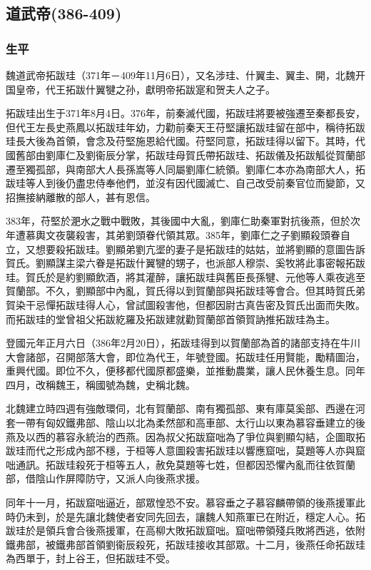 
\subsection{道武帝\tiny(386-409)}

\subsubsection{生平}

魏道武帝拓跋珪（371年－409年11月6日），又名涉珪、什翼圭、翼圭、開，北魏开国皇帝，代王拓跋什翼犍之孙，獻明帝拓跋寔和贺夫人之子。

拓跋珪出生于371年8月4日。376年，前秦滅代國，拓跋珪將要被強遷至秦都長安，但代王左長史燕鳳以拓跋珪年幼，力勸前秦天王苻堅讓拓跋珪留在部中，稱待拓跋珪長大後為首領，會念及苻堅施恩給代國。苻堅同意，拓跋珪得以留下。其時，代國舊部由劉庫仁及劉衞辰分掌，拓跋珪母賀氏帶拓跋珪、拓跋儀及拓跋觚從賀蘭部遷至獨孤部，與南部大人長孫嵩等人同屬劉庫仁統領。劉庫仁本亦為南部大人，拓跋珪等人到後仍盡忠侍奉他們，並沒有因代國滅亡、自己改受前秦官位而變節，又招撫接納離散的部人，甚有恩信。

383年，苻堅於淝水之戰中戰敗，其後國中大亂，劉庫仁助秦軍對抗後燕，但於次年遭慕輿文夜襲殺害，其弟劉頭眷代領其眾。385年，劉庫仁之子劉顯殺頭眷自立，又想要殺拓跋珪。劉顯弟劉亢埿的妻子是拓跋珪的姑姑，並將劉顯的意圖告訴賀氏。劉顯謀主梁六眷是拓跋什翼犍的甥子，也派部人穆崇、奚牧將此事密報拓跋珪。賀氏於是約劉顯飲酒，將其灌醉，讓拓跋珪與舊臣長孫犍、元他等人乘夜逃至賀蘭部。不久，劉顯部中內亂，賀氏得以到賀蘭部與拓跋珪等會合。但其時賀氏弟賀染干忌憚拓跋珪得人心，曾試圖殺害他，但都因尉古真告密及賀氏出面而失敗。而拓跋珪的堂曾祖父拓跋紇羅及拓跋建就勸賀蘭部首領賀訥推拓跋珪為主。

登國元年正月六日（386年2月20日），拓跋珪得到以賀蘭部為首的諸部支持在牛川大會諸部，召開部落大會，即位為代王，年號登國。拓跋珪任用賢能，勵精圖治，重興代國。即位不久，便移都代國原都盛樂，並推動農業，讓人民休養生息。同年四月，改稱魏王，稱國號為魏，史稱北魏。

北魏建立時四週有強敵環伺，北有賀蘭部、南有獨孤部、東有庫莫奚部、西邊在河套一帶有匈奴鐵弗部、陰山以北為柔然部和高車部、太行山以東為慕容垂建立的後燕及以西的慕容永統治的西燕。因為叔父拓跋窟咄為了爭位與劉顯勾結，企圖取拓跋珪而代之形成內部不穩，于桓等人意圖殺害拓跋珪以響應窟咄，莫題等人亦與窟咄通訊。拓跋珪殺死于桓等五人，赦免莫題等七姓，但都因恐懼內亂而往依賀蘭部，借陰山作屏障防守，又派人向後燕求援。

同年十一月，拓跋窟咄逼近，部眾惶恐不安。慕容垂之子慕容麟帶領的後燕援軍此時仍未到，於是先讓北魏使者安同先回去，讓魏人知燕軍已在附近，穩定人心。拓跋珪於是領兵會合後燕援軍，在高柳大敗拓跋窟咄。窟咄帶領殘兵敗將西逃，依附鐵弗部，被鐵弗部首領劉衞辰殺死，拓跋珪接收其部眾。十二月，後燕任命拓跋珪為西單于，封上谷王，但拓跋珪不受。


